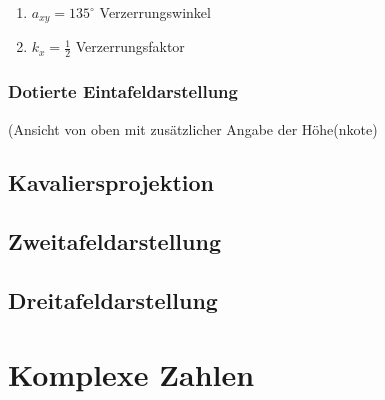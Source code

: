 \documentclass[12pt,a4paper]{scrbook}
\begin{document}
\begin{enumerate}
\item $a_{xy} = 135^{\circ}$ Verzerrungswinkel
\item $k_{x} = \frac{1}{2}$ Verzerrungsfaktor
\end{enumerate}

\subsection{Dotierte Eintafeldarstellung}
(Ansicht von oben mit zusätzlicher Angabe der Höhe(nkote)
\begin{figure}

\end{figure}

\section{Kavaliersprojektion}
\section{Zweitafeldarstellung}
\section{Dreitafeldarstellung}


\chapter{Komplexe Zahlen}
\end{document}
